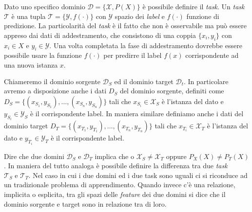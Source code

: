 Dato uno specifico dominio $\mathcal{D} = \{\mathcal{X}, P(X)\}$ è possibile definire il \textit{task}. Un \textit{task} $\mathcal{T}$ è una tupla $\mathcal{T} = \{\mathcal{Y},f(\cdot)\}$ con $\mathcal{Y}$ spazio dei \textit{label} e $f(\cdot)$ funzione di predizione. La particolarità del \textit{task} è il fatto che non è osservabile ma può essere appreso dai dati di addestramento, che consistono di una coppia $\{x_i, y_i\}$ con $x_i \in X$ e $y_i \in \mathcal{Y}$. Una volta completata la fase di addestramento dovrebbe essere possibile usare la funzione $f(\cdot)$ per predirre il label $f(x)$ corrispondente ad una nuova istanza $x$.

Chiameremo il dominio sorgente $\mathcal{D}_S$ ed il dominio target $\mathcal{D}_t$. In particolare avremo a disposizione anche i dati $D_S$ del dominio sorgente, definiti 
come $D_S = \{(x_{S_1}, y_{S_1}), \dots, (x_{S_n}, y_{S_n})\}$ tali che $x_{S_i} \in \mathcal{X}_S$ è l'istanza del dato e $y_{S_i} \in \mathcal{Y}_S$ è il corrispondente label. In maniera similare definiamo anche i dati del dominio target $D_T = \{(x_{T_1}, y_{T_1}), \dots, (x_{T_n}, y_{T_n})\} $ tali che $x_{T_i} \in \mathcal{X}_T$ è l'istanza del dato e $y_{T_i} \in \mathcal{Y}_T$ è il corrispondente label. 

Dire che due domini $\mathcal{D}_S$ e $\mathcal{D}_T$ implica che  o $\mathcal{X}_S \neq \mathcal{X}_T$ oppure $P_X(X) \neq P_T(X)$. In maniera del tutto analoga è possibile definire la differenza tra due \textit{task} $\mathcal{T}_S \text{ e } \mathcal{T}_T$. Nel caso in cui i due domini ed i due task sono uguali ci si riconduce ad un tradizionale problema di apprendimento. Quando invece c'è una relazione, implicita o esplicita, tra gli spazi delle \textit{feature} dei due domini si dice che il dominio sorgente e target sono in relazione tra di loro.
